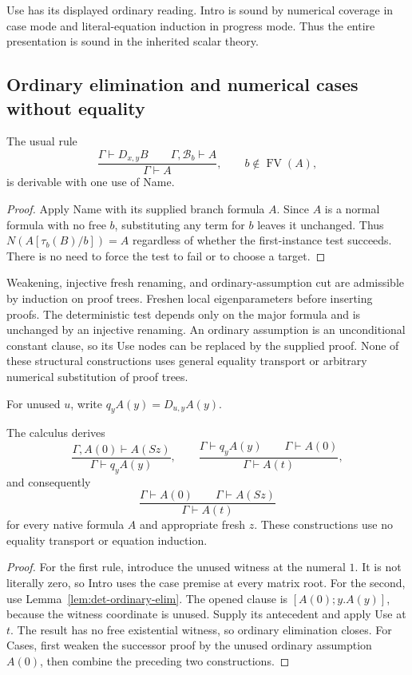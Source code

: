 Use has its displayed ordinary reading. Intro is sound by numerical
coverage in case mode and literal-equation induction in progress mode.
Thus the entire presentation is sound in the inherited scalar theory.

\subsection{Ordinary elimination and numerical cases without equality}

\begin{lemma}
\label{lem:det-ordinary-elim}
The usual rule
\[
 \frac{\Gamma\vdash D_{x,y}B\qquad
       \Gamma,\mathcal B_b\vdash A}
      {\Gamma\vdash A},\qquad b\notin\operatorname{FV}(A),
\]
is derivable with one use of Name.
\end{lemma}
\begin{proof}
Apply Name with its supplied branch formula $A$. Since $A$ is a normal
formula with no free $b$, substituting any term for $b$ leaves it unchanged.
Thus $N(A[\tau_b(B)/b])=A$ regardless of whether the first-instance test
succeeds. There is no need to force the test to fail or to choose a target.
\end{proof}

Weakening, injective fresh renaming, and ordinary-assumption cut are
admissible by induction on proof trees. Freshen local eigenparameters
before inserting proofs. The deterministic test depends only on the
major formula and is unchanged by an injective renaming. An ordinary
assumption is an unconditional constant clause, so its Use nodes can be
replaced by the supplied proof. None of these structural constructions
uses general equality transport or arbitrary numerical substitution of
proof trees.

For unused $u$, write $q_y A(y)=D_{u,y}A(y)$.
\begin{lemma}
\label{lem:det-cases}
The calculus derives
\[
 \frac{\Gamma,A(0)\vdash A(Sz)}{\Gamma\vdash q_yA(y)},
 \qquad
 \frac{\Gamma\vdash q_yA(y)\qquad\Gamma\vdash A(0)}
      {\Gamma\vdash A(t)},
\]
and consequently
\[
 \frac{\Gamma\vdash A(0)\qquad\Gamma\vdash A(Sz)}
      {\Gamma\vdash A(t)}
 \tag{Cases}\label{eq:det-cases}
\]
for every native formula $A$ and appropriate fresh $z$.
These constructions use no equality transport or equation induction.
\end{lemma}
\begin{proof}
For the first rule, introduce the unused witness at the numeral $1$.
It is not literally zero, so Intro uses the case premise at every matrix
root. For the second, use Lemma~\ref{lem:det-ordinary-elim}. The opened
clause is $[A(0);y.A(y)]$, because the witness coordinate is unused.
Supply its antecedent and apply Use at $t$. The result has no free
existential witness, so ordinary elimination closes. For Cases, first
weaken the successor proof by the unused ordinary assumption $A(0)$,
then combine the preceding two constructions.
\end{proof}

